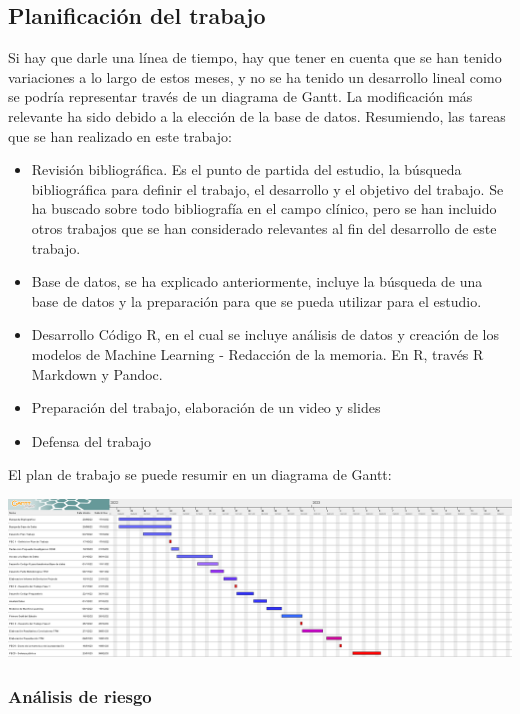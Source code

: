 \documentclass[
]{article}
\begin{document}
\hypertarget{planificaciuxf3n-del-trabajo}{%
\subsection{Planificación del
trabajo}\label{planificaciuxf3n-del-trabajo}}

Si hay que darle una línea de tiempo, hay que tener en cuenta que se han
tenido variaciones a lo largo de estos meses, y no se ha tenido un
desarrollo lineal como se podría representar través de un diagrama de
Gantt. La modificación más relevante ha sido debido a la elección de la
base de datos. Resumiendo, las tareas que se han realizado en este
trabajo:

\begin{itemize}
\item
  Revisión bibliográfica. Es el punto de partida del estudio, la
  búsqueda bibliográfica para definir el trabajo, el desarrollo y el
  objetivo del trabajo. Se ha buscado sobre todo bibliografía en el
  campo clínico, pero se han incluido otros trabajos que se han
  considerado relevantes al fin del desarrollo de este trabajo.
\item
  Base de datos, se ha explicado anteriormente, incluye la búsqueda de
  una base de datos y la preparación para que se pueda utilizar para el
  estudio.
\item
  Desarrollo Código R, en el cual se incluye análisis de datos y
  creación de los modelos de Machine Learning - Redacción de la memoria.
  En R, través R Markdown y Pandoc.
\item
  Preparación del trabajo, elaboración de un video y slides
\item
  Defensa del trabajo
\end{itemize}

El plan de trabajo se puede resumir en un diagrama de Gantt:

\includegraphics{Untitled Project 5.png}

\hypertarget{anuxe1lisis-de-riesgo}{%
\subsubsection{Análisis de riesgo}\label{anuxe1lisis-de-riesgo}}
\end{document}
